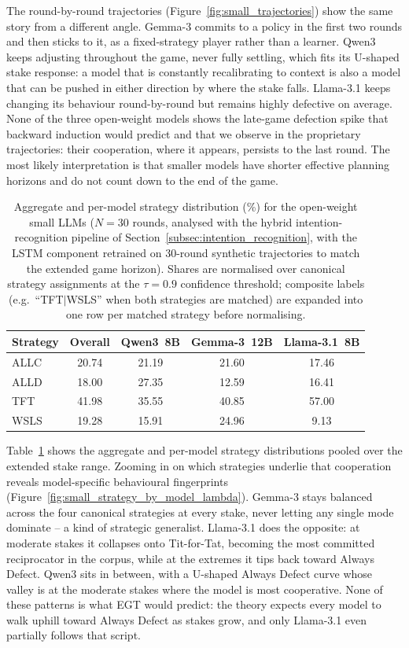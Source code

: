 \documentclass[a4paper,fleqn]{cas-sc}
\begin{document}
The round-by-round trajectories (Figure~\ref{fig:small_trajectories}) show the same story from a different angle. Gemma-3 commits to a policy in the first two rounds and then sticks to it, as a fixed-strategy player rather than a learner. Qwen3 keeps adjusting throughout the game, never fully settling, which fits its U-shaped stake response: a model that is constantly recalibrating to context is also a model that can be pushed in either direction by where the stake falls. Llama-3.1 keeps changing its behaviour  round-by-round but remains highly defective on average. None of the three open-weight models shows the late-game defection spike that backward induction would predict and that we observe in the proprietary trajectories: their cooperation, where it appears, persists to the last round. The most likely interpretation is that smaller models have shorter effective planning horizons and do not count down to the end of the game.

\begin{table}[pos=H]
\centering
\caption{Aggregate and per-model strategy distribution (\%) for the open-weight small LLMs ($N{=}30$ rounds, analysed with the hybrid intention-recognition pipeline of Section~\ref{subsec:intention_recognition}, with the LSTM component retrained on 30-round synthetic trajectories to match the extended game horizon). Shares are normalised over canonical strategy assignments at the $\tau{=}0.9$ confidence threshold; composite labels (e.g.\ ``TFT$|$WSLS'' when both strategies are matched) are expanded into one row per matched strategy before normalising.}
\label{tab:small_strategy_by_llm}
\footnotesize
\begin{tabular}{lcccc}
\toprule
\textbf{Strategy} & \textbf{Overall} & \textbf{Qwen3~8B} & \textbf{Gemma-3~12B} & \textbf{Llama-3.1~8B} \\
\midrule
ALLC & 20.74 & 21.19 & 21.60 & 17.46 \\
ALLD & 18.00 & 27.35 & 12.59 & 16.41 \\
TFT  & 41.98 & 35.55 & 40.85 & 57.00 \\
WSLS & 19.28 & 15.91 & 24.96 &  9.13 \\
\bottomrule
\end{tabular}
\end{table}

Table~\ref{tab:small_strategy_by_llm} shows the aggregate and per-model strategy distributions pooled over the extended stake range. Zooming in on which strategies underlie that cooperation reveals model-specific behavioural fingerprints (Figure~\ref{fig:small_strategy_by_model_lambda}). Gemma-3 stays balanced across the four canonical strategies at every stake, never letting any single mode dominate -- a kind of strategic generalist. Llama-3.1 does the opposite: at moderate stakes it collapses onto Tit-for-Tat, becoming the most committed reciprocator in the corpus, while at the extremes it tips back toward Always Defect. Qwen3 sits in between, with a U-shaped Always Defect curve whose valley is at the moderate stakes where the model is most cooperative. None of these patterns is what EGT would predict: the theory expects every model to walk uphill toward Always Defect as stakes grow, and only Llama-3.1 even partially follows that script.
\end{document}
